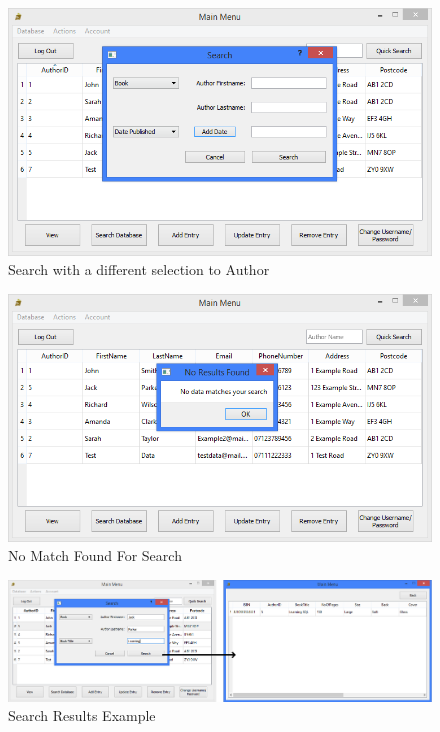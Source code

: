 \begin{figure}[H]
    \caption{Search with a different selection to Author} \label{fig:SearchSelectionChosen}
    \includegraphics[width=\textwidth]{./Maintenance/UserInterface/SearchSelectionChosen.png}
\end{figure}

\begin{figure}[H]
    \caption{No Match Found For Search} \label{fig:NoMatchSearch}
    \includegraphics[width=\textwidth]{./Maintenance/UserInterface/NoMatchSearch.png}
\end{figure}

\begin{figure}[H]
    \caption{Search Results Example} \label{fig:SearchExample}
    \includegraphics[width=\textwidth]{./Maintenance/UserInterface/SearchExample.png}
\end{figure}


